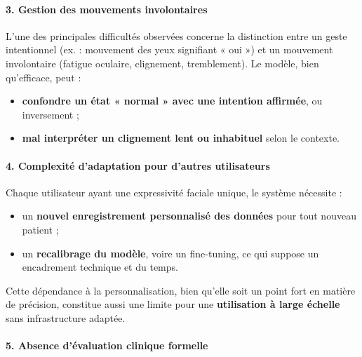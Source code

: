 \documentclass[
]{article}
\begin{document}
\hypertarget{gestion-des-mouvements-involontaires}{%
\paragraph{\texorpdfstring{\textbf{3. Gestion des mouvements involontaires}}{3. Gestion des mouvements involontaires}}\label{gestion-des-mouvements-involontaires}}

L'une des principales difficultés observées concerne la distinction entre un geste intentionnel (ex. : mouvement des yeux signifiant « oui ») et un mouvement involontaire (fatigue oculaire, clignement, tremblement). Le modèle, bien qu'efficace, peut :

\begin{itemize}
\item
  \textbf{confondre un état « normal » avec une intention affirmée}, ou inversement ;
\item
  \textbf{mal interpréter un clignement lent ou inhabituel} selon le contexte.
\end{itemize}

\hypertarget{complexituxe9-dadaptation-pour-dautres-utilisateurs}{%
\paragraph{\texorpdfstring{\textbf{4. Complexité d'adaptation pour d'autres utilisateurs}}{4. Complexité d'adaptation pour d'autres utilisateurs}}\label{complexituxe9-dadaptation-pour-dautres-utilisateurs}}

Chaque utilisateur ayant une expressivité faciale unique, le système nécessite :

\begin{itemize}
\item
  un \textbf{nouvel enregistrement personnalisé des données} pour tout nouveau patient ;
\item
  un \textbf{recalibrage du modèle}, voire un fine-tuning, ce qui suppose un encadrement technique et du temps.
\end{itemize}

Cette dépendance à la personnalisation, bien qu'elle soit un point fort en matière de précision, constitue aussi une limite pour une \textbf{utilisation à large échelle} sans infrastructure adaptée.

\hypertarget{absence-duxe9valuation-clinique-formelle}{%
\paragraph{\texorpdfstring{\textbf{5. Absence d'évaluation clinique formelle}}{5. Absence d'évaluation clinique formelle}}\label{absence-duxe9valuation-clinique-formelle}}
\end{document}
